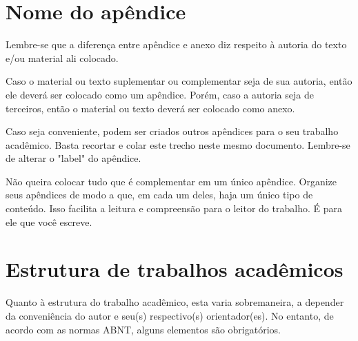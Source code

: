 


\begin{apendicesenv}
\partapendices





\chapter{Nome do apêndice} 			%
\label{chap:apendiceA}

Lembre-se que a diferença entre apêndice e anexo diz respeito à autoria do texto e/ou material ali colocado.

Caso o material ou texto suplementar ou complementar seja de sua autoria, então ele deverá ser colocado como um apêndice. Porém, caso a autoria seja de terceiros, então o material ou texto deverá ser colocado como anexo.

Caso seja conveniente, podem ser criados outros apêndices para o seu trabalho acadêmico. Basta recortar e colar este trecho neste mesmo documento. Lembre-se de alterar o "label"{} do apêndice.

Não queira colocar tudo que é complementar em um único apêndice. Organize seus apêndices de modo a que, em cada um deles, haja um único tipo de conteúdo. Isso facilita a leitura e compreensão para o leitor do trabalho. É para ele que você escreve.



\chapter{Estrutura de trabalhos acadêmicos}
\label{chap:apEstrTrabAcad}


Quanto à estrutura do trabalho acadêmico, esta varia sobremaneira, a depender da conveniência do autor e seu(s) respectivo(s) orientador(es). No entanto, de acordo com as normas ABNT, alguns elementos são obrigatórios.


\end{apendicesenv}
